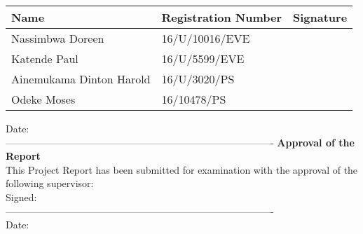 \documentclass{article}
\begin{document}
\begin{table}[h!]
\centering

\begin{tabu} to 1.3\textwidth { | X[l] | X[c] | X[r] | }
 \hline
 Name & Registration Number & Signature \\
 \hline
 Nassimbwa Doreen  & 16/U/10016/EVE  &   \\
\hline
 Katende Paul &16/U/5599/EVE  &  \\
 \hline
 Ainemukama Dinton Harold  & 16/U/3020/PS  &   \\
\hline
 Odeke Moses  & 16/10478/PS  &  \\
\hline
\end{tabu}
\end{table}

\vspace{1.0in}
\noindent
Date: \\
----------------------------------------------------------------------------------
\newpage
\textbf{Approval of the  Report}\\

 This Project Report has been submitted for examination with the approval of the following supervisor:\\

\vspace{0.5in}
\noindent
Signed: \\

----------------------------------------------------------------------------------\\

\vspace{0.5in}
\noindent
Date:\\
\end{document}
